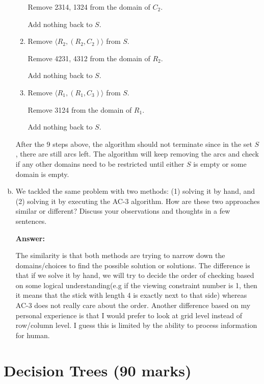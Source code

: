 \documentclass[12pt]{article}
\begin{document}
\begin{enumerate}[(a)]
\begin{enumerate}[(1)]
Remove 2314, 1324 from the domain of $C_2$.

Add nothing back to $S$.

\item Remove $\langle R_2, (R_2, C_2) \rangle$ from $S$.

Remove 4231, 4312 from the domain of $R_2$.

Add nothing back to $S$.

\item Remove $\langle R_1, (R_1, C_3) \rangle$ from $S$.

Remove 3124 from the domain of $R_1$.

Add nothing back to $S$.

\end{enumerate}

After the 9 steps above, the algorithm should not terminate since in the set $S$, there are still arcs left. The algorithm will keep removing the arcs and check if any other domains need to be restricted until either $S$ is empty or some domain is empty.




\item
We tackled the same problem with two methods: (1) solving it by hand, and (2) solving it by executing the AC-3 algorithm. How are these two approaches similar or different? Discuss your observations and thoughts in a few sentences.

{\bf Answer:}

The similarity is that both methods are trying to narrow down the domains/choices to find the possible solution or solutions. The difference is that if we solve it by hand, we will try to decide the order of checking based on some logical understanding(e.g if the viewing constraint number is 1, then it means that the stick with length 4 is exactly next to that side) whereas AC-3 does not really care about the order. Another difference based on my personal experience is that I would prefer to look at grid level instead of row/column level. I guess this is limited by the ability to process information for human.



\end{enumerate}



\newpage
\section{Decision Trees (90 marks)}
\label{question_dt}
\end{document}
